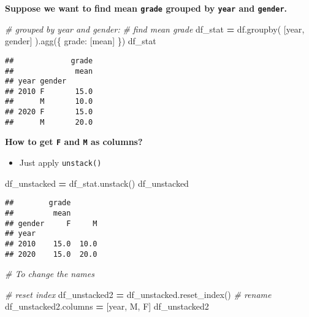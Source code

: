 \documentclass[
]{book}
\newenvironment{Shaded}{\begin{snugshade}}{\end{snugshade}}
\newcommand{\CommentTok}[1]{\textcolor[rgb]{0.56,0.35,0.01}{\textit{#1}}}
\newcommand{\NormalTok}[1]{#1}
\newcommand{\OperatorTok}[1]{\textcolor[rgb]{0.81,0.36,0.00}{\textbf{#1}}}
\newcommand{\StringTok}[1]{\textcolor[rgb]{0.31,0.60,0.02}{#1}}
\providecommand{\tightlist}{%
  \setlength{\itemsep}{0pt}\setlength{\parskip}{0pt}}
\begin{document}
\textbf{Suppose we want to find mean \texttt{grade} grouped by \texttt{year} and \texttt{gender}.}

\begin{Shaded}
\begin{Highlighting}[]
\CommentTok{\# grouped by year and gender:}
\CommentTok{\# find mean grade}
\NormalTok{df\_stat }\OperatorTok{=}\NormalTok{ df.groupby(}
\NormalTok{    [}\StringTok{\textquotesingle{}year\textquotesingle{}}\NormalTok{, }\StringTok{\textquotesingle{}gender\textquotesingle{}}\NormalTok{]}
\NormalTok{).agg(\{}
    \StringTok{\textquotesingle{}grade\textquotesingle{}}\NormalTok{: [}\StringTok{\textquotesingle{}mean\textquotesingle{}}\NormalTok{]}
\NormalTok{\})}
\NormalTok{df\_stat}
\end{Highlighting}
\end{Shaded}

\begin{verbatim}
##             grade
##              mean
## year gender      
## 2010 F       15.0
##      M       10.0
## 2020 F       15.0
##      M       20.0
\end{verbatim}

\textbf{How to get \texttt{F} and \texttt{M} as columns?}

\begin{itemize}
\tightlist
\item
  Just apply \texttt{unstack()}
\end{itemize}

\begin{Shaded}
\begin{Highlighting}[]
\NormalTok{df\_unstacked }\OperatorTok{=}\NormalTok{ df\_stat.unstack()}
\NormalTok{df\_unstacked}
\end{Highlighting}
\end{Shaded}

\begin{verbatim}
##        grade      
##         mean      
## gender     F     M
## year              
## 2010    15.0  10.0
## 2020    15.0  20.0
\end{verbatim}

\begin{Shaded}
\begin{Highlighting}[]
\CommentTok{\# To change the names}

\CommentTok{\# reset index}
\NormalTok{df\_unstacked2 }\OperatorTok{=}\NormalTok{ df\_unstacked.reset\_index()}
\CommentTok{\# rename}
\NormalTok{df\_unstacked2.columns }\OperatorTok{=}\NormalTok{ [}\StringTok{\textquotesingle{}year\textquotesingle{}}\NormalTok{, }\StringTok{\textquotesingle{}M\textquotesingle{}}\NormalTok{, }\StringTok{\textquotesingle{}F\textquotesingle{}}\NormalTok{]}
\NormalTok{df\_unstacked2}
\end{Highlighting}
\end{Shaded}
\end{document}
